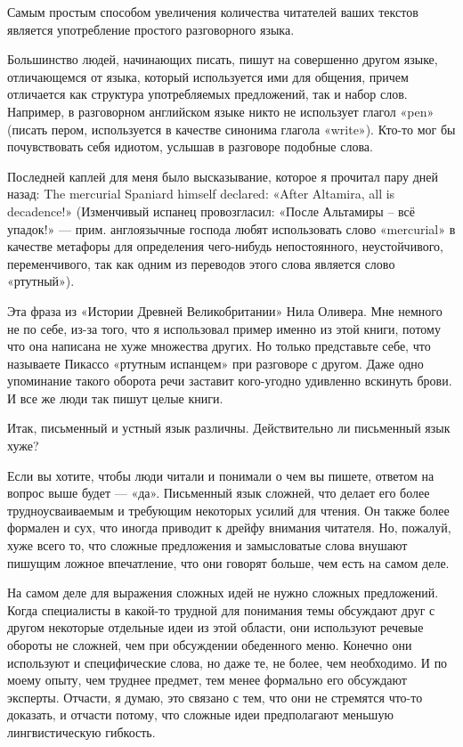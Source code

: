 \documentclass[ebook,12pt,oneside,openany]{memoir}
\begin{document}
\maketitle

Самым простым способом увеличения количества читателей ваших текстов
является употребление простого разговорного языка.

Большинство людей, начинающих писать, пишут на совершенно другом
языке, отличающемся от языка, который используется ими для общения,
причем отличается как структура употребляемых предложений, так и набор
слов. Например, в разговорном английском языке никто не использует
глагол «pen» (писать пером, используется в качестве синонима глагола
«write»). Кто-то мог бы почувствовать себя идиотом, услышав в
разговоре подобные слова.

Последней каплей для меня было высказывание, которое я прочитал пару
дней назад: The mercurial Spaniard himself declared: «After Altamira,
all is decadence!» (Изменчивый испанец провозгласил: «После Альтамиры
– всё упадок!» — прим. англоязычные господа любят использовать слово
«mercurial» в качестве метафоры для определения чего-нибудь
непостоянного, неустойчивого, переменчивого, так как одним из
переводов этого слова является слово «ртутный»).

Эта фраза из «Истории Древней Великобритании» Нила Оливера. Мне
немного не по себе, из-за того, что я использовал пример именно из
этой книги, потому что она написана не хуже множества других. Но
только представьте себе, что называете Пикассо «ртутным испанцем» при
разговоре с другом. Даже одно упоминание такого оборота речи заставит
кого-угодно удивленно вскинуть брови. И все же люди так пишут целые
книги.

Итак, письменный и устный язык различны. Действительно ли письменный
язык хуже?

Если вы хотите, чтобы люди читали и понимали о чем вы пишете, ответом
на вопрос выше будет — «да». Письменный язык сложней, что делает его
более трудноусваиваемым и требующим некоторых усилий для чтения. Он
также более формален и сух, что иногда приводит к дрейфу внимания
читателя. Но, пожалуй, хуже всего то, что сложные предложения и
замысловатые слова внушают пишущим ложное впечатление, что они говорят
больше, чем есть на самом деле.

На самом деле для выражения сложных идей не нужно сложных предложений.
Когда специалисты в какой-то трудной для понимания темы обсуждают друг
с другом некоторые отдельные идеи из этой области, они используют
речевые обороты не сложней, чем при обсуждении обеденного меню.
Конечно они используют и специфические слова, но даже те, не более,
чем необходимо. И по моему опыту, чем труднее предмет, тем менее
формально его обсуждают эксперты. Отчасти, я думаю, это связано с тем,
что они не стремятся что-то доказать, и отчасти потому, что сложные
идеи предполагают меньшую лингвистическую гибкость.
\end{document}
